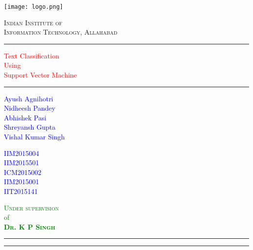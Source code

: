 \documentclass{report}
\begin{document}
 
\begin{titlepage}
	\centering
	\texttt{[image: logo.png]}\\[.5cm]
	{\scshape\LARGE Indian Institute of \\Information Technology, Allahabad \par}
	\vspace{1cm}
	\rule{\textwidth}{2pt}	
	\vspace{0.1\textheight}
		
	\textcolor{Red}{ 
		{\fontsize{35}{42}\selectfont Text Classification}\\[0.5\baselineskip]
		{\fontsize{24}{28.8}\selectfont Using}\\[0.5\baselineskip]
		{\fontsize{35}{42}\selectfont Support Vector Machine}
	}
	
	\vspace{0.155\textheight} 
	
	\rule{0.3\textwidth}{0.4pt} 
	\begin{multicols}{3} 
	\textcolor{Blue}{
		\begin{flushleft} 
		{\large Ayush Agnihotri}\\[5pt] 
		{\large Nidheesh Pandey}\\[5pt]
		{\large Abhishek Pasi}\\[5pt]
		{\large Shreyansh Gupta}\\[5pt]
		{\large Vishal Kumar Singh}\\[5pt]
		\end{flushleft}
		}
		\columnbreak
		 
	\textcolor{Blue}{
		\begin{flushleft} 
		{\large IIM2015004}\\[5pt] 
		{\large IIM2015501}\\[5pt]
		{\large ICM2015002}\\[5pt]
		{\large IIM2015001}\\[5pt]
		{\large IIT2015141}\\[5pt]
		\end{flushleft}
		}
		\columnbreak

	\textcolor{Green}{
		\begin{flushright}
		{\Large \textsc{Under supervision}}\\
		{\large of}\\
		{\Large \textsc{\textbf{Dr. K P Singh}}}
		\end{flushright}
		}
	\end{multicols}
	
\hfill
		
	\rule{\textwidth}{0.4pt} %
	
	\vspace{2pt}\vspace{-\baselineskip} %
	
	\rule{\textwidth}{2pt} %
	
\end{titlepage}
\end{document}

